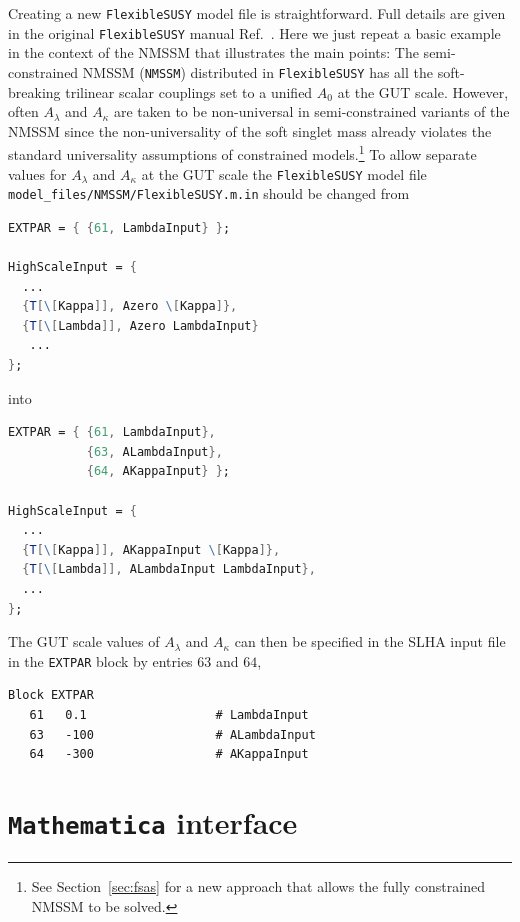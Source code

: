 \documentclass[final,3p,11pt,pdflatex]{elsarticle}
\makeatletter
\newcommand{\modelname}[1]{\texttt{#1}\@\xspace}
\newcommand{\fs}{\texttt{FlexibleSUSY}\@\xspace}
\newcommand{\mathematica}{\texttt{Ma\-the\-ma\-ti\-ca}\xspace}
\newcommand{\code}[1]{\lstinline|#1|}  %
\newcommand{\secref}[1]{Section~\ref{#1}}
\newcommand{\azero}{\ensuremath{A_0}\xspace}
\makeatother
\begin{document}
Creating a new \fs model file is straightforward. Full details are
given in the original \fs manual Ref.~\cite{Athron:2014yba}.
Here we just repeat a basic example
in the context of the NMSSM that illustrates the main points:
%
The semi-constrained NMSSM (\modelname{NMSSM}) distributed in \fs has
all the soft-breaking trilinear scalar couplings set to a unified
$\azero$ at the GUT scale.  However, often $A_\lambda$ and $A_\kappa$ are
taken to be non-universal in semi-constrained variants of the NMSSM
since the non-universality of the soft singlet mass already violates
the standard universality assumptions of constrained
models.\footnote{See \secref{sec:fsas} for a new approach that
  allows the fully constrained NMSSM to be solved.} To allow separate
values for $A_\lambda$ and $A_\kappa$ at the GUT scale the \fs model
file \code{model_files/NMSSM/FlexibleSUSY.m.in} should be changed from
%
\begin{lstlisting}[language=Mathematica]
EXTPAR = { {61, LambdaInput} };

HighScaleInput = {
  ...
  {T[\[Kappa]], Azero \[Kappa]},
  {T[\[Lambda]], Azero LambdaInput}
   ...
};
\end{lstlisting}
%
into
%
\begin{lstlisting}[language=Mathematica]
EXTPAR = { {61, LambdaInput},
           {63, ALambdaInput},
           {64, AKappaInput} };

HighScaleInput = {
  ...
  {T[\[Kappa]], AKappaInput \[Kappa]},
  {T[\[Lambda]], ALambdaInput LambdaInput},
  ...
};
\end{lstlisting}
%
The GUT scale values of $A_\lambda$ and $A_\kappa$ can then be specified in the SLHA input file in the \code{EXTPAR} block by entries $63$ and $64$,
%
\begin{lstlisting}
Block EXTPAR
   61   0.1                  # LambdaInput
   63   -100                 # ALambdaInput
   64   -300                 # AKappaInput

\end{lstlisting}

\section{\mathematica interface}
\label{sec:Mathematica_interface}
\end{document}
